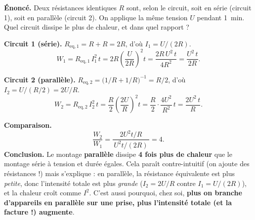 \documentclass[11pt,a4paper]{article}
\begin{document}
\begin{exemple}
\textbf{Énoncé.} Deux résistances identiques $R$ sont, selon le circuit, soit en série (circuit 1),
soit en parallèle (circuit 2). On applique la même tension $U$ pendant \SI{1}{\minute}. Quel circuit
dissipe le plus de chaleur, et dans quel rapport ?

\smallskip
\textbf{Circuit 1 (série).} $R_{\mathrm{eq},1}=R+R=2R$, d'où $I_1=U/(2R)$.
\[ W_1 = R_{\mathrm{eq},1}\,I_1^{2}\,t = 2R\left(\frac{U}{2R}\right)^{2}t
   = \frac{2R\,U^{2}\,t}{4R^{2}} = \frac{U^{2}\,t}{2R}. \]

\textbf{Circuit 2 (parallèle).} $R_{\mathrm{eq},2}=\bigl(1/R+1/R\bigr)^{-1}=R/2$, d'où $I_2=U/(R/2)=2U/R$.
\[ W_2 = R_{\mathrm{eq},2}\,I_2^{2}\,t = \frac{R}{2}\left(\frac{2U}{R}\right)^{2}t
   = \frac{R}{2}\cdot\frac{4U^{2}}{R^{2}}\,t = \frac{2U^{2}\,t}{R}. \]

\textbf{Comparaison.}
\[ \frac{W_2}{W_1} = \frac{\,2U^{2}t/R\,}{\,U^{2}t/(2R)\,} = 4. \]
\textbf{Conclusion.} Le montage \textbf{parallèle} dissipe \textbf{4 fois plus de chaleur} que le
montage série à tension et durée égales. Cela paraît contre-intuitif (on ajoute des résistances !)
mais s'explique : en parallèle, la résistance équivalente est plus \emph{petite}, donc l'intensité
totale est plus \emph{grande} ($I_2=2U/R$ contre $I_1=U/(2R)$), et la chaleur croît comme $I^2$.
C'est aussi pourquoi, chez soi, \textbf{plus on branche d'appareils en parallèle sur une prise,
plus l'intensité totale (et la facture !) augmente}.
\end{exemple}
\end{document}
